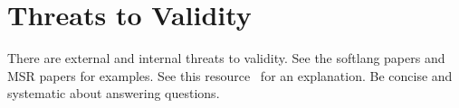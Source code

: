 \section{Threats to Validity}
\label{sec:threats-to-validity}

There are external and internal threats to validity. See the softlang
papers and MSR papers for examples. See this resource~\cite{Michael04}
for an explanation. Be concise and systematic about answering
questions.
